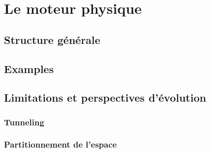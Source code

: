 \section{Le moteur physique}

\subsection{Structure générale}

\subsection{Examples}

\subsection{Limitations et perspectives d'évolution}

\subsubsection{Tunneling}

\subsubsection{Partitionnement de l'espace}


